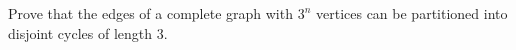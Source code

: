 Prove that the edges of a complete graph with $3^n$ vertices can be partitioned into disjoint cycles of length $3$.